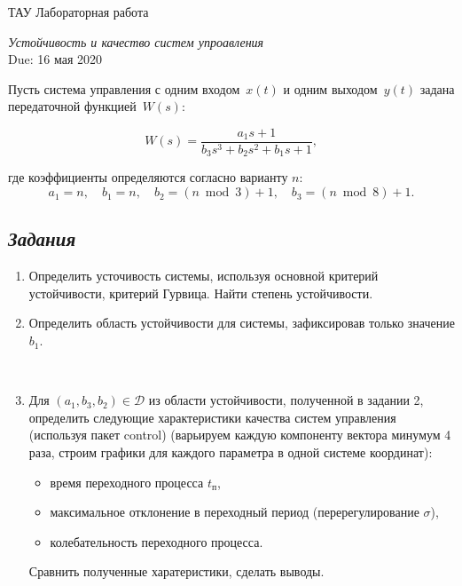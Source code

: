 \documentclass[a4paper,oneside,10pt]{book}
\theoremstyle{definition}
\begin{document}
\begin{center}
	{\large  ТАУ \hspace{0.1cm} Лабораторная работа }

	\vspace{5pt}
	\textit{\large Устойчивость и качество систем упроавления}\\ %
	\vspace{10pt}
	Due: 16 мая 2020 %
\end{center}

\vspace{0.2 cm}



Пусть система управления с одним входом~$ x(t) $ и одним выходом~$ y(t) $ задана  передаточной функцией~$ W(s) $:

\begin{equation*}
	W(s) =
	\dfrac{a_1 s+1}
	{b_3 s^3 + b_2 s^2 + b_1 s +1} ,
\end{equation*}

где коэффициенты  определяются согласно варианту $ n $:
\begin{equation*}
	a_1 = n, \quad b_1 = n, \quad b_2 = (n\bmod 3) + 1, \quad b_3 = (n \bmod 8) + 1.
\end{equation*}

\subsection*{\textit{Задания}}

\begin{enumerate}
	\item
	      Определить усточивость системы, используя основной критерий устойчивости, критерий Гурвица. Найти степень устойчивости.
	\item
	      Определить область устойчивости для системы, зафиксировав только значение $ b_1 $.

	      \


	\item
	      Для   $(a_1, b_3, b_2)  \in \mathcal{D}$ из области устойчивости, полученной в задании 2, определить следующие характеристики качества систем управления (используя пакет control) (варьируем каждую компоненту вектора минумум 4 раза, строим графики для каждого параметра в одной системе координат):
	      \begin{itemize}
		      \item
		            время переходного процесса $ t_{\text{п}} $,
		      \item
		            максимальное отклонение в переходный период (перерегулирование $ \sigma $),
		      \item
		            колебательность переходного процесса.

	      \end{itemize}

	      Сравнить полученные харатеристики, сделать выводы.
\end{enumerate}
\end{document}
